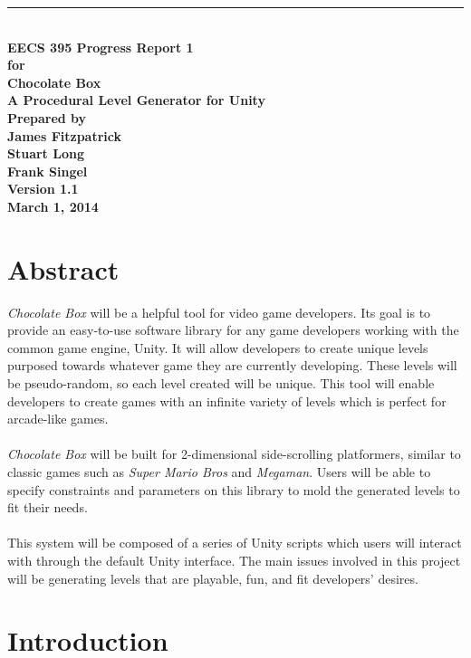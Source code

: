 \documentclass[pdftex,12pt,letter]{article}
\newcommand{\HRule}{\rule{\linewidth}{0.5mm}}
\begin{document}
\begin{titlepage}
\begin{flushright}
\HRule \\[0.4cm]
{ \bfseries
{\huge EECS 395 Progress Report 1\\[1cm]}
{\Large for\\[1cm]}
{\huge Chocolate Box\large\\[.1cm]
A Procedural Level Generator for Unity\\[3cm]}
{\large Prepared by\\[1cm]James Fitzpatrick\\Stuart Long\\Frank Singel\\[2cm]
Version 1.1\\
March 1, 2014\\
}}
\end{flushright}
\end{titlepage}
\FloatBarrier
\newpage
\tableofcontents
\newpage
\section{Abstract}
\textit{Chocolate Box} will be a helpful tool for video game developers. Its goal is to provide an easy-to-use software library for any game developers working with the common game engine, Unity. It will allow developers to create unique levels purposed towards whatever game they are currently developing. These levels will be pseudo-random, so each level created will be unique. This tool will enable developers to create games with an infinite variety of levels which is perfect for arcade-like games. 
\\\\
\textit{Chocolate Box} will be built for 2-dimensional side-scrolling platformers, similar to classic games such as \textit{Super Mario Bros} and \textit{Megaman}. Users will be able to specify constraints and parameters on this library to mold the generated levels to fit their needs. 
\\\\
This system will be composed of a series of Unity scripts which users will interact with through the default Unity interface. The main issues involved in this project will be generating levels that are playable, fun, and fit developers' desires.
\newpage

\section{Introduction}
\end{document}

